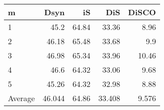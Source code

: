 \begin{tabular}{lrrrr}
  \toprule
m & Dsyn & iS & DiS & DiSCO \\ 
  \midrule
1 & 45.2 & 64.84 & 33.36 & 8.96 \\ 
  2 & 46.18 & 65.48 & 33.68 & 9.9 \\ 
  3 & 46.98 & 65.34 & 33.96 & 10.46 \\ 
  4 & 46.6 & 64.32 & 33.06 & 9.68 \\ 
  5 & 45.26 & 64.32 & 32.98 & 8.88 \\ 
  Average & 46.044 & 64.86 & 33.408 & 9.576 \\ 
   \bottomrule
\end{tabular}
